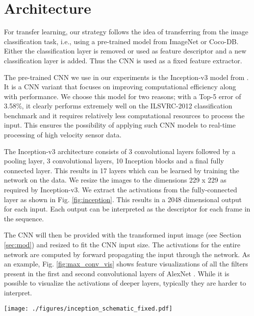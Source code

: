 \section{Architecture}

For transfer learning, our strategy follows the idea of transferring from the image classification task, i.e., using a pre-trained model from ImageNet or Coco-DB. Either the classification layer is removed or used as feature descriptor and a new classification layer is added. Thus the CNN is used as a fixed feature extractor.

The pre-trained CNN we use in our experiments is the Inception-v3 model from \cite{inceptionv3}. It is a CNN variant that focuses on improving computational efficiency along with performance. We choose this model for two reasons; with a Top-5 error of 3.58\%, it clearly performs extremely well on the ILSVRC-2012 classification benchmark and it requires relatively less computational resources to process the input. This ensures the possibility of applying such CNN models to real-time processing of high velocity sensor data.

The Inception-v3 architecture consists of 3 convolutional layers followed by a pooling layer, 3 convolutional layers, 10 Inception blocks and a final fully connected layer. This results in 17 layers which can be learned by training the network on the data. We resize the images to the dimensions 229 x 229 as required by Inception-v3. We extract the activations from the fully-connected layer as shown in Fig. \ref{fig:inception}. This results in a 2048 dimensional output for each input. Each output can be interpreted as the descriptor for each frame in the sequence.

The CNN will then be provided with the transformed input image (see Section \ref{sec:mod}) and resized to fit the CNN input size. The activations for the entire network
are computed by forward propagating the input through the network. As an example, Fig. \ref{fig:max_conv_vis} shows feature visualizations of all the filters present in the first and second convolutional layers of AlexNet \cite{deconv}. While it is possible to visualize the activations of deeper layers, typically they are harder to interpret.


\begin{figure*}
	\centering
	\texttt{[image: ./figures/inception\_schematic\_fixed.pdf]}
	\caption{Simplified diagram of Inception-v3 cropped at the fully connected layer.}
	\label{fig:inception}
\end{figure*}
\par



